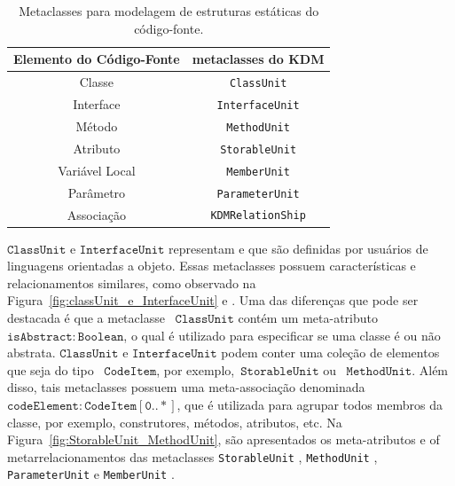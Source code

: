 \begin{table}[h]
\centering
\caption{Metaclasses para modelagem de estruturas estáticas do código-fonte.}
\label{tab:meta_classes_pacoteCODE}
\begin{tabular}{|l|l|}
\hline
Elemento do Código-Fonte & metaclasses do KDM \\ \hline
\multicolumn{1}{|c|}{Classe}                   & \multicolumn{1}{|c|}{\texttt{ClassUnit}}           \\ \hline
\multicolumn{1}{|c|}{Interface}                & \multicolumn{1}{|c|}{\texttt{InterfaceUnit}}       \\ \hline
\multicolumn{1}{|c|}{Método}                   & \multicolumn{1}{|c|}{\texttt{MethodUnit}}          \\ \hline
\multicolumn{1}{|c|}{Atributo}                 & \multicolumn{1}{|c|}{\texttt{StorableUnit}}        \\ \hline
\multicolumn{1}{|c|}{Variável Local}           & \multicolumn{1}{|c|}{\texttt{MemberUnit}}          \\ \hline
\multicolumn{1}{|c|}{Parâmetro}                & \multicolumn{1}{|c|}{\texttt{ParameterUnit}}       \\ \hline
\multicolumn{1}{|c|}{Associação}               & \multicolumn{1}{|c|}{\texttt{KDMRelationShip}}     \\ \hline
\end{tabular}
\end{table}


$\mathtt{ClassUnit}$ e $\mathtt{InterfaceUnit}$ representam  e  que são definidas por usuários de linguagens orientadas a objeto. Essas metaclasses possuem características e relacionamentos similares, como observado na Figura~\ref{fig:classUnit_e_InterfaceUnit}  e . Uma das diferenças que pode ser destacada é que a metaclasse ~$\mathtt{ClassUnit}$ contém um meta-atributo~$\mathtt{isAbstract:Boolean}$, o qual é utilizado para especificar se uma classe é ou não abstrata. $\mathtt{ClassUnit}$ e $\mathtt{InterfaceUnit}$ podem conter uma coleção de elementos que seja do tipo ~$\mathtt{CodeItem}$, por exemplo,~$\mathtt{StorableUnit}$ ou ~$\mathtt{MethodUnit}$. Além disso, tais metaclasses  possuem uma meta-associação denominada ~$\mathtt{codeElement:CodeItem[0..*]}$, que é utilizada para agrupar todos membros da classe, por exemplo, construtores, métodos, atributos, etc. Na Figura~\ref{fig:StorableUnit_MethodUnit}, são apresentados os meta-atributos e of metarrelacionamentos das metaclasses \texttt{StorableUnit} , \texttt{MethodUnit} , \texttt{ParameterUnit}  e \texttt{MemberUnit} .

